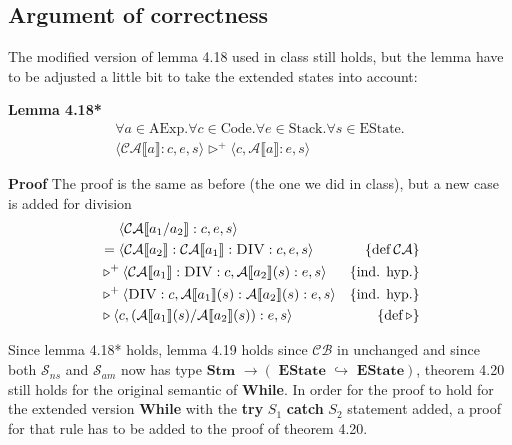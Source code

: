\documentclass[11pt,oneside,a4paper]{article}
\begin{document}
\subsection*{Argument of correctness}
The modified version of lemma 4.18 used in class still holds, 
but the lemma have to be adjusted a little bit to take the 
extended states into account:

{\bf Lemma 4.18*} 
\begin{align*}
\forall a \in \text{AExp}.\forall c \in \text{Code}.\forall e \in \text{Stack}.
\forall s \in \text{EState}. \\
\langle\mathcal{CA}\llbracket a \rrbracket:c, e, s \rangle \triangleright^+ 
\langle c, \mathcal{A}\llbracket a \rrbracket:e, s \rangle
\end{align*}

{\bf Proof}
The proof is the same as before (the one we did in class), 
but a new case is added for division
\begin{align*}
[a \equiv a_1 / a_2]&\:\:\:\:\:\: \langle \mathcal{CA}\llbracket a_1 / a_2 
\rrbracket:c,
e, s \rangle \\
&= \langle \mathcal{CA}\llbracket a_2 \rrbracket:\mathcal{CA} \llbracket a_1
\rrbracket:\textsc{DIV}:c, e, s\rangle & \{\text{def}\:\mathcal{CA}\} \\
&\triangleright^+ \langle \mathcal{CA} \llbracket a_1 \rrbracket:\textsc{DIV}:c,
\mathcal{A}\llbracket a_2 \rrbracket(s):e, s \rangle & \{\text{ind. hyp.}\} \\
&\triangleright^+ \langle \textsc{DIV}:c,
\mathcal{A}\llbracket a_1 \rrbracket(s):\mathcal{A}\llbracket a_2 
\rrbracket(s):e, 
s \rangle & \{\text{ind. hyp.}\} \\
&\triangleright \langle c, (\mathcal{A}\llbracket a_1 \rrbracket(s) /
\mathcal{A}\llbracket a_2 \rrbracket(s)):e, s \rangle & \{\text{def}\: 
\triangleright\} \\
\end{align*}

Since lemma 4.18* holds, lemma 4.19 holds since \(\mathcal{CB}\) in unchanged  
and since both 
\(\mathcal{S}_{ns}\) and \(\mathcal{S}_{am}\) now has type \(\textbf{Stm } 
\rightarrow (\textbf{ EState }
\hookrightarrow \textbf{ EState})\), 
theorem 4.20 still holds for the original semantic of \textbf{While}. In order
for the proof to hold for the extended version \textbf{While} with the {\bf
try} \(S_1\) {\bf catch} \(S_2\) statement added, 
a proof for that rule has to be added to the proof of theorem 4.20.
\end{document}
